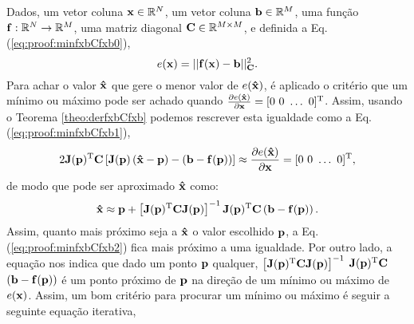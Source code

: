 \begin{myproofT}\label{proof:theo:minfxbCfxb}
Dados,
um vetor coluna $\VECTOR{x}\in \mathbb{R}^N$, 
um vetor coluna $\VECTOR{b}\in \mathbb{R}^M$,  
uma função $\VECTOR{f}:\mathbb{R}^{N} \rightarrow \mathbb{R}^{M}$, 
uma matriz diagonal $\MATRIX{C} \in \mathbb{R}^{M\times M}$, e 
definida a Eq. (\ref{eq:proof:minfxbCfxb0}),
\begin{equation}\label{eq:proof:minfxbCfxb0}
e(\VECTOR{x})=||\VECTOR{f}(\VECTOR{x})-\VECTOR{b}||_{\MATRIX{C}}^2.
\end{equation}
Para achar o valor  $\VECTOR{\hat{x}}$ que gere o menor valor de $e(\VECTOR{\hat{x}})$, é aplicado
o critério que um mínimo ou máximo pode ser achado quando 
$\frac{\partial e(\VECTOR{\hat{x}})}{\partial \VECTOR{x} }=[0~ 0~ \hdots~ 0 ]^{\transpose}$.
Assim, usando o Teorema \ref{theo:derfxbCfxb} podemos 
rescrever esta igualdade como a Eq. (\ref{eq:proof:minfxbCfxb1}),
\begin{equation}\label{eq:proof:minfxbCfxb1}
2 \MATRIX{J}(\VECTOR{p})^{\transpose}\MATRIX{C}\left[\MATRIX{J}(\VECTOR{p})\left(\VECTOR{\hat{x}} - \VECTOR{p}\right)-\left(\VECTOR{b}-\VECTOR{f}(\VECTOR{p})\right)\right] \approx
\frac{\partial e(\VECTOR{\hat{x}})}{\partial \VECTOR{x} }=[0~ 0~ \hdots~ 0 ]^{\transpose},
\end{equation}
de modo que pode ser aproximado $\VECTOR{\hat{x}}$ como:
\begin{equation}\label{eq:proof:minfxbCfxb2}
\VECTOR{\hat{x}} \approx \VECTOR{p} +
\left[ \MATRIX{J}(\VECTOR{p})^{\transpose}\MATRIX{C} \MATRIX{J}(\VECTOR{p}) \right]^{-1}
\MATRIX{J}(\VECTOR{p})^{\transpose}\MATRIX{C} \left(\VECTOR{b}-\VECTOR{f}(\VECTOR{p})\right).
\end{equation}
Assim, quanto mais próximo seja a $\VECTOR{\hat{x}}$ o valor escolhido $\VECTOR{p}$, 
a Eq. (\ref{eq:proof:minfxbCfxb2}) fica mais próximo a uma igualdade. Por outro lado,
a equação nos indica que dado um ponto  $\VECTOR{p}$ qualquer,
$\left[ \MATRIX{J}(\VECTOR{p})^{\transpose}\MATRIX{C} \MATRIX{J}(\VECTOR{p}) \right]^{-1}$ 
$\MATRIX{J}(\VECTOR{p})^{\transpose}\MATRIX{C}$ $\left(\VECTOR{b}-\VECTOR{f}(\VECTOR{p})\right)$
é um ponto próximo de $\VECTOR{p}$  na direção de um mínimo ou máximo de $ e(\VECTOR{x})$.
Assim, um bom critério para procurar um mínimo ou máximo é seguir a seguinte 
equação iterativa,

\end{myproofT}
